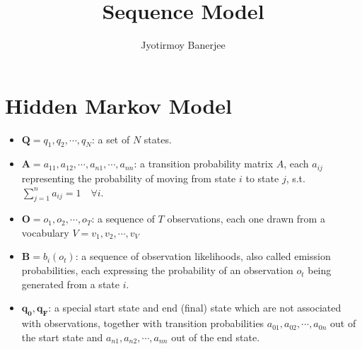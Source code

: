 \documentclass{article}
\title{Sequence Model}
\author{Jyotirmoy Banerjee}
\begin{document}
\maketitle


\section{Hidden Markov Model}

\begin{itemize}
\item $\mathbf{Q} = q_1,q_2, \cdots, q_N$: a set of $N$ states.
\item $\mathbf{A} = a_{11},a_{12}, \cdots, a_{n1}, \cdots, a_{nn}$: a transition probability matrix $A$, each $a_{ij}$ representing the probability of moving from state $i$ to state $j$, s.t.\ $\sum_{j=1}^{n}a_{ij} = 1 \quad  \forall i$.
\item $\mathbf{O} = o_1, o_2, \cdots, o_T$: a sequence of $T$ observations, each one drawn from a vocabulary $V = v_1, v_2, \cdots, v_V$
\item $\mathbf{B} = b_i(o_t)$: a sequence of observation likelihoods, also called emission probabilities, each expressing the probability of an observation $o_t$ being generated from a state $i$.
\item $\mathbf{q_0,q_F}$: a special start state and end (final) state which are not associated with observations, together with transition probabilities $a_{01},a_{02}, \cdots, a_{0n}$ out of the start state and $a_{n1},a_{n2}, \cdots, a_{nn}$ out of the end state.
\end{itemize}
\end{document}
